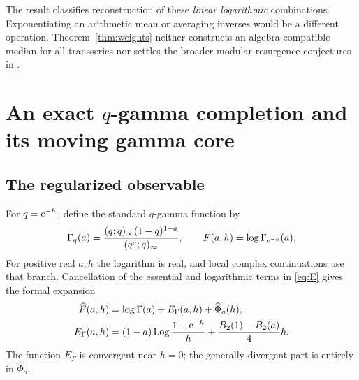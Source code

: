 \documentclass[11pt,a4paper]{article}
\numberwithin{equation}{section}
\theoremstyle{definition}
\theoremstyle{remark}\newtheorem{remark}[theorem]{Remark}
\newcommand{\Log}{\operatorname{Log}}\newcommand{\Li}{\operatorname{Li}}
\begin{document}
The result classifies reconstruction of these \emph{linear logarithmic}
combinations. Exponentiating an arithmetic mean or averaging inverses
would be a different operation. Theorem~\ref{thm:weights} neither
constructs an algebra-compatible median for all transseries nor settles
the broader modular-resurgence conjectures in \cite{fr}.

\section{An exact \texorpdfstring{$q$}{q}-gamma completion and its moving gamma core}
\label{sec:qgamma}

\subsection{The regularized observable}
For $q=\mathrm e^{-h}$, define the standard $q$-gamma function \cite{dlmfqgamma}
by
\begin{equation}\label{eq:qgamma}
 \Gamma_q(a)=\frac{(q;q)_\infty(1-q)^{1-a}}{(q^a;q)_\infty},
 \qquad F(a,h)=\log\Gamma_{\mathrm e^{-h}}(a).
\end{equation}
For positive real $a,h$ the logarithm is real, and local complex
continuations use that branch. Cancellation of the essential and
logarithmic terms in \eqref{eq:E} gives the formal expansion
\begin{align}
 \widehat F(a,h)&=\log\Gamma(a)+E_\Gamma(a,h)+\widehat\Phi_a(h),
                  \label{eq:Fhat}\\
 E_\Gamma(a,h)&=(1-a)\Log\frac{1-\e^{-h}}h
                  +\frac{B_2(1)-B_2(a)}4h.\label{eq:Egamma}
\end{align}
The function $E_\Gamma$ is convergent near $h=0$; the generally divergent
part is entirely in $\widehat\Phi_a$.
\end{document}
